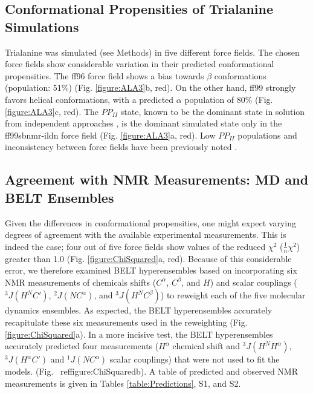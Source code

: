 \documentclass[12pt]{article}
\begin{document}
\subsection*{Conformational Propensities of Trialanine Simulations}

Trialanine was simulated (see Methods) in five different force fields.  The chosen force fields show considerable variation in their predicted conformational propensities.  The ff96 force field shows a bias towards $\beta$ conformations (population: 51\%) (Fig. \ref{figure:ALA3}b, red).  On the other hand, ff99 strongly favors helical conformations, with a predicted $\alpha$ population of 80\% (Fig. \ref{figure:ALA3}c, red).  The $PP_{II}$ state, known to be the dominant state in solution from independent approaches \cite{Grdadolnik2011, Graf2007, Avbelj2006}, is the dominant simulated state only in the ff99sbnmr-ildn force field (Fig. \ref{figure:ALA3}a, red).  Low $PP_{II}$ populations and inconsistency between force fields have been previously noted \cite{Graf2007, beauchamp2012protein, nerenberg2011, best2008}.  

\subsection*{Agreement with NMR Measurements: MD and BELT Ensembles}

Given the differences in conformational propensities, one might expect varying degrees of agreement with the available experimental measurements.  This is indeed the case; four out of five force fields show values of the reduced $\chi^2$ ($\frac{1}{n} \chi^2$) greater than 1.0 (Fig. \ref{figure:ChiSquared}a, red).  Because of this considerable error, we therefore examined BELT hyperensembles based on incorporating six NMR measurements of chemicals shifts ($C^\alpha$, $C^\beta$, and $H$) and scalar couplings ($^3J(H^N C')$,  $^2J(N C^\alpha)$, and $^3J(H^N C^\beta)$) to reweight each of the five molecular dynamics ensembles.  As expected, the BELT hyperensembles accurately recapitulate these six measurements used in the reweighting (Fig.  \ref{figure:ChiSquared}a).  In a more incisive test, the BELT hyperensembles accurately predicted four measurements ($H^\alpha$ chemical shift and $^3J(H^N H^\alpha)$, $^3J(H^\alpha C')$ and $^1J(N C^\alpha)$ scalar couplings) that were not used to fit the models.   (Fig. \
ref{figure:ChiSquared}b).  
A table of predicted and observed NMR measurements is given in Tables \ref{table:Predictions}, S1, and S2.  
\end{document}
